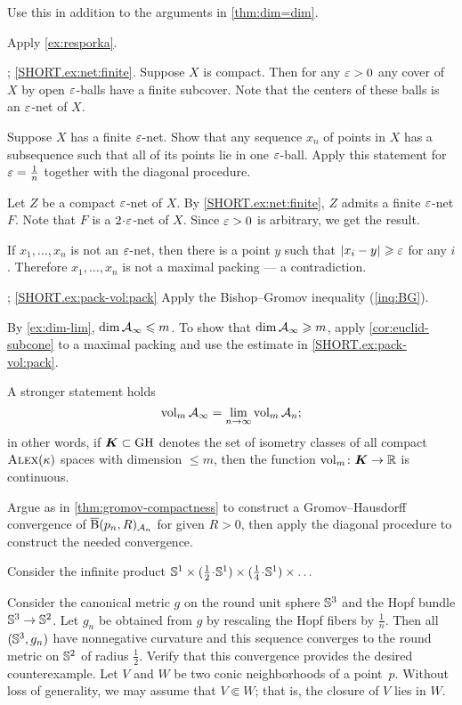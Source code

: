 Use this in addition to the arguments in \ref{thm:dim=dim}. 

Apply \ref{ex:resporka}.

\parbf{\ref{ex:net}};
\ref{SHORT.ex:net:finite}.
Suppose $X$ is compact.
Then for any $\varepsilon>0$ any cover of $X$ by open $\varepsilon$-balls have a finite subcover.
Note that the centers of these balls is an $\varepsilon$-net of $X$.

Suppose $X$ has a finite $\varepsilon$-net.
Show that any sequence $x_n$ of points in $X$ has a subsequence such that all of its points lie in one $\varepsilon$-ball.
Apply this statement for $\varepsilon=\tfrac1n$ together with the diagonal procedure.

Let $Z$ be a compact $\varepsilon$-net of $X$.
By \ref{SHORT.ex:net:finite}, $Z$ admits a finite $\varepsilon$-net $F$.
Note that $F$ is a $2\cdot\eps$-net of $X$.
Since $\varepsilon>0$ is arbitrary, we get the result.


 If $x_1,\dots,x_n$ is not an $\varepsilon$-net, then there is a point $y$ such that $|{x_i}-{y}|_{}^{{}}\geqslant\varepsilon$ for any $i$.
Therefore $x_1,\dots,x_n$ is not a maximal packing --- a contradiction.

\parbf{\ref{ex:pack-vol}}; \ref{SHORT.ex:pack-vol:pack}
Apply the Bishop--Gromov inequality (\ref{inq:BG}).

\parit{\ref{SHORT.ex:pack-vol:dim}}
By \ref{ex:dim-lim}, $\operatorname{\rm dim}\nolimits\mathcal{A}_\infty\leqslant m$.
To show that $\operatorname{\rm dim}\nolimits\mathcal{A}_\infty\geqslant m$,
apply \ref{cor:euclid-subcone} to a maximal packing and use the estimate in \ref{SHORT.ex:pack-vol:pack}.

A stronger statement holds 
\[\operatorname{\rm vol}\nolimits_m\mathcal{A}_\infty=\lim_{n\to\infty} \operatorname{\rm vol}\nolimits_m\mathcal{A}_n;\]
in other words, if $\bm{K}\subset \operatorname{\rm GH}\nolimits$ denotes the set of isometry classes of all compact $\textsc{Alex}(\kappa)$ spaces with dimension $\le m$, then the function
$\operatorname{\rm vol}\nolimits_m\colon\bm{K}\to \mathbb{R}$ is continuous.


Argue as in \ref{thm:gromov-compactness} to construct a Gromov--Hausdorff convergence of $\overline{\mathrm{B}}{}(p_n,R)_{\mathcal{A}_n}$ for given $R>0$, then apply the diagonal procedure to construct the needed convergence.

Consider the infinite product $\SSS^1\times ({\tfrac 12}\cdot \SSS^1)\times ({\tfrac 14}\cdot \SSS^1)\times\dots$

 Consider the canonical metric $g$ on the round unit sphere $\mathbb{S}^3$ and the Hopf bundle $\mathbb{S}^3\to \mathbb{S}^2$. Let $g_n$ be obtained from $g$ by rescaling the Hopf fibers by $\frac{1}{n}$.
Then all  $(\mathbb{S}^3,g_n)$ have nonnegative curvature and this sequence converges to the round metric on $\mathbb{S}^2$ of radius $\frac{1}{2}$. Verify that this convergence provides the desired counterexample.
Let $V$ and $W$ be two conic neighborhoods of a point~$p$.
Without loss of generality, we may assume that $V\Subset W$;
that is, the closure of $V$ lies in $W$.

